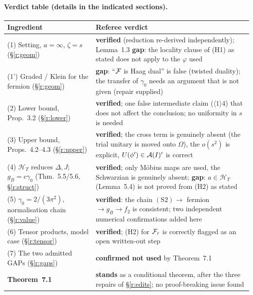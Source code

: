 \documentclass[11pt]{article}
\newcommand{\HT}{\mathcal H_T}
\newcommand{\gB}{g_B}
\newcommand{\Om}{\Omega}
\begin{document}
\paragraph{Verdict table (details in the indicated sections).}
\begin{center}\small
\begin{tabular}{@{}p{}p{}@{}}\toprule
\textbf{Ingredient} & \textbf{Referee verdict}\\\midrule
(1) Setting, $a=\infty$, $\zeta=s$ (\S\ref{r:geom}) & \textbf{verified} (reduction re-derived independently);
 Lemma~1.3 \textbf{gap}: the locality clause of (H1) as stated does not apply to the $\varphi$ used\\
(1') Graded / Klein for the fermion (\S\ref{r:geom}) & \textbf{gap}: ``$\mathcal F$ is Haag dual'' is false
 (twisted duality); the transfer of $\gamma_0$ needs an argument that is not given (repair supplied)\\
(2) Lower bound, Prop.~3.2 (\S\ref{r:lower}) & \textbf{verified}; one false intermediate claim
 ($\langle1\rangle4$) that does not affect the conclusion; no uniformity in $s$ is needed\\
(3) Upper bound, Props.~4.2--4.3 (\S\ref{r:upper}) & \textbf{verified}; the cross term is genuinely absent
 (the trial unitary is moved onto $\Om$), the $o(s^2)$ is explicit, $U(\phi')\in\mathcal A(I)'$ is correct\\
(4) $\HT$ reduces $\Delta,J$; $\gB=c\gamma_0$ (Thm.~5.5/5.6, \S\ref{r:struct})
 & \textbf{verified}; only M\"obius maps are used, the Schwarzian is genuinely absent;
 \textbf{gap}: $a\in\HT$ (Lemma~5.4) is not proved from (H2) as stated\\
(5) $\gamma_0=2/(3\pi^2)$, normalisation chain (\S\ref{r:value})
 & \textbf{verified}: the chain $(\text{S2})\to$ fermion $\to\gB\to f_2$ is consistent; two independent
 numerical confirmations added here\\
(6) Tensor products, model case (\S\ref{r:tensor}) & \textbf{verified}; (H2) for $\mathcal F_r$ is correctly
 flagged as an open written-out step\\
(7) The two admitted GAPs (\S\ref{r:gaps}) & \textbf{confirmed not used} by Theorem~7.1\\\midrule
\textbf{Theorem~7.1} & \textbf{stands} as a conditional theorem, after the three repairs of
 \S\ref{r:edits}; no proof-breaking issue found\\\bottomrule
\end{tabular}
\end{center}
\end{document}

